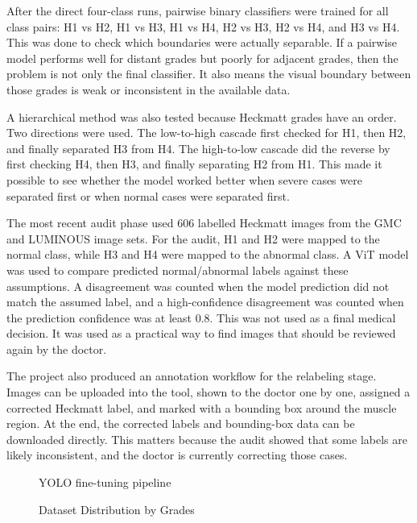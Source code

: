 After the direct four-class runs, pairwise binary classifiers were trained for all class pairs: H1 vs H2, H1 vs H3, H1 vs H4, H2 vs H3, H2 vs H4, and H3 vs H4. This was done to check which boundaries were actually separable. If a pairwise model performs well for distant grades but poorly for adjacent grades, then the problem is not only the final classifier. It also means the visual boundary between those grades is weak or inconsistent in the available data.

A hierarchical method was also tested because Heckmatt grades have an order. Two directions were used. The low-to-high cascade first checked for H1, then H2, and finally separated H3 from H4. The high-to-low cascade did the reverse by first checking H4, then H3, and finally separating H2 from H1. This made it possible to see whether the model worked better when severe cases were separated first or when normal cases were separated first.

The most recent audit phase used 606 labelled Heckmatt images from the GMC and LUMINOUS image sets. For the audit, H1 and H2 were mapped to the normal class, while H3 and H4 were mapped to the abnormal class. A ViT model was used to compare predicted normal/abnormal labels against these assumptions. A disagreement was counted when the model prediction did not match the assumed label, and a high-confidence disagreement was counted when the prediction confidence was at least 0.8. This was not used as a final medical decision. It was used as a practical way to find images that should be reviewed again by the doctor.

The project also produced an annotation workflow for the relabeling stage. Images can be uploaded into the tool, shown to the doctor one by one, assigned a corrected Heckmatt label, and marked with a bounding box around the muscle region. At the end, the corrected labels and bounding-box data can be downloaded directly. This matters because the audit showed that some labels are likely inconsistent, and the doctor is currently correcting those cases.


\begin{figure}[H]
\centering
{}
\caption{YOLO fine-tuning pipeline}
\label{fig:yolo_finetune}
\end{figure}

\begin{figure}[H]
\centering
{}
\caption{Dataset Distribution by Grades}
\label{fig:dataset_distribution}
\end{figure}



